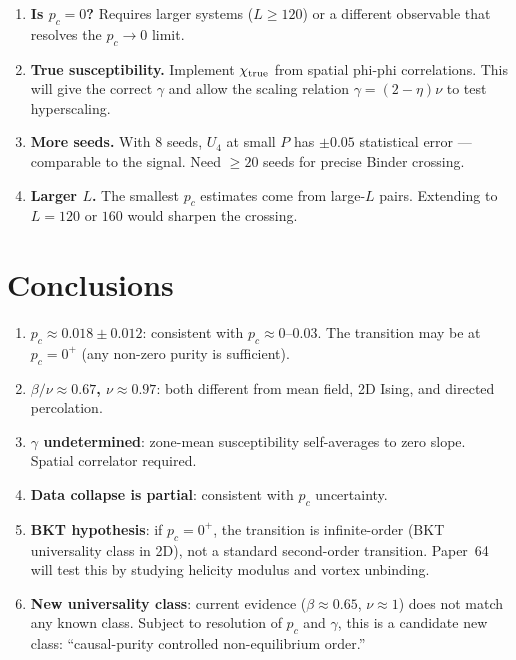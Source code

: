 \documentclass[12pt,a4paper]{article}
\begin{document}
\begin{enumerate}
  \item \textbf{Is $p_c = 0$?} Requires larger systems ($L \geq 120$) or
    a different observable that resolves the $p_c \to 0$ limit.
  \item \textbf{True susceptibility.} Implement $\chi_{\rm true}$ from spatial
    phi-phi correlations. This will give the correct $\gamma$ and allow the
    scaling relation $\gamma = (2-\eta)\nu$ to test hyperscaling.
  \item \textbf{More seeds.} With 8 seeds, $U_4$ at small $P$ has $\pm 0.05$
    statistical error --- comparable to the signal. Need $\geq 20$ seeds for
    precise Binder crossing.
  \item \textbf{Larger $L$.} The smallest $p_c$ estimates come from large-$L$
    pairs. Extending to $L = 120$ or $160$ would sharpen the crossing.
\end{enumerate}

\section{Conclusions}

\begin{enumerate}
  \item \textbf{$p_c \approx 0.018 \pm 0.012$}: consistent with $p_c \approx 0$--$0.03$.
    The transition may be at $p_c = 0^+$ (any non-zero purity is sufficient).
  \item \textbf{$\beta/\nu \approx 0.67$, $\nu \approx 0.97$}: both different from
    mean field, 2D Ising, and directed percolation.
  \item \textbf{$\gamma$ undetermined}: zone-mean susceptibility self-averages to zero slope.
    Spatial correlator required.
  \item \textbf{Data collapse is partial}: consistent with $p_c$ uncertainty.
  \item \textbf{BKT hypothesis}: if $p_c = 0^+$, the transition is infinite-order
    (BKT universality class in 2D), not a standard second-order transition.
    Paper~64 will test this by studying helicity modulus and vortex unbinding.
  \item \textbf{New universality class}: current evidence ($\beta \approx 0.65$, $\nu \approx 1$)
    does not match any known class. Subject to resolution of $p_c$ and $\gamma$,
    this is a candidate new class: ``causal-purity controlled non-equilibrium order.''
\end{enumerate}
\end{document}

